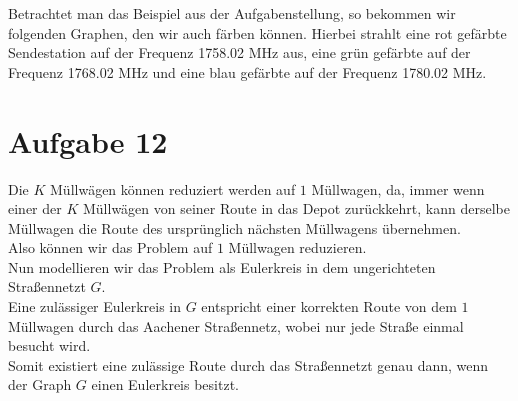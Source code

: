 \documentclass[12pt, a4paper]{article}
\begin{document}
Betrachtet man das Beispiel aus der Aufgabenstellung, so bekommen wir folgenden Graphen, den wir auch färben können.
Hierbei strahlt eine rot gefärbte Sendestation auf der Frequenz 1758.02 MHz aus, eine grün gefärbte auf der Frequenz 1768.02 MHz und eine blau gefärbte auf der Frequenz 1780.02 MHz.\\
\begin{center}\end{center}



\newpage



\section*{Aufgabe 12}
Die $K$ Müllwägen können reduziert werden auf $1$ Müllwagen, da, immer wenn einer der $K$ Müllwägen von seiner Route in das Depot zurückkehrt, kann derselbe Müllwagen die Route des ursprünglich nächsten Müllwagens übernehmen.\\
Also können wir das Problem auf $1$ Müllwagen reduzieren.\\

Nun modellieren wir das Problem als Eulerkreis in dem ungerichteten Straßennetzt $G$.\\
Eine zulässiger Eulerkreis in $G$ entspricht einer korrekten Route von dem $1$ Müllwagen durch das Aachener Straßennetz, wobei nur jede Straße einmal besucht wird.\\
Somit existiert eine zulässige Route durch das Straßennetzt genau dann, wenn der Graph $G$ einen Eulerkreis besitzt.


\newpage
\end{document}

